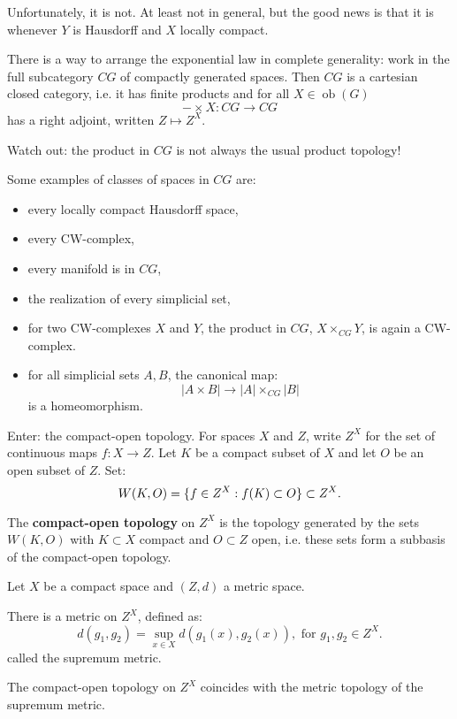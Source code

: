 Unfortunately, it is not. At least not in general, but the good news is that it is whenever $Y$ is Hausdorff and $X$ locally compact.

\begin{remark}
There is a way to arrange the exponential law in complete generality: work in the full subcategory $CG$ of compactly generated spaces. Then $CG$ is a cartesian closed category, i.e. it has finite products and for all $X\in\operatorname{ob}(G)$
\[-\times X:CG\to CG\]
has a right adjoint, written $Z\mapsto Z^X$.

Watch out: the product in $CG$ is not always the usual product topology!

Some examples of classes of spaces in $CG$ are:
\begin{itemize}[label={-}]
    \item every locally compact Hausdorff space,
    \item every CW-complex,
    \item every manifold is in $CG$,
    \item the realization of every simplicial set,
    \item for two CW-complexes $X$ and $Y$, the product in $CG$, $X\times_{CG}Y$, is again a CW-complex.
    \item for all simplicial sets $A,B$, the canonical map:
    \[|A\times B|\to|A|\times_{CG}|B|\]
    is a homeomorphism.
\end{itemize}
\end{remark}

Enter: the compact-open topology. For spaces $X$ and $Z$, write $Z^X$ for the set of continuous maps $f:X\to Z$. Let $K$ be a compact subset of $X$ and let $O$ be an open subset of $Z$. Set:
\[W(K,O)=\{f\in Z^X:f(K)\subset O\}\subset Z^X.\]

The \textbf{compact-open topology} on $Z^X$ is the topology generated by the sets $W(K,O)$ with $K\subset X$ compact and $O\subset Z$ open, i.e. these sets form a subbasis of the compact-open topology.

\begin{theorem}
Let $X$ be a compact space and $(Z,d)$ a metric space.
\begin{numerate}
\item There is a metric on $Z^X$, defined as:
\[d(g_1,g_2)=\sup_{x\in X}d(g_1(x),g_2(x)),\text{ for }g_1,g_2\in Z^X.\]
called the supremum metric.
\item The compact-open topology on $Z^X$ coincides with the metric topology of the supremum metric.
\end{numerate}
\end{theorem}

